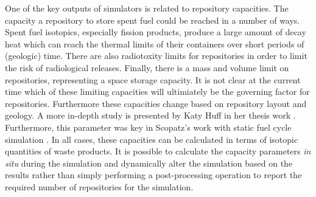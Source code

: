 One of the key outputs of simulators is related to repository capacities. The
capacity a repository to store spent fuel could be reached in a number of
ways. Spent fuel isotopics, especially fission products, produce a large amount
of decay heat which can reach the thermal limits of their containers over short
periods of (geologic) time. There are also radiotoxity limits for repositories
in order to limit the risk of radiological releases. Finally, there is a mass
and volume limit on repositories, representing a space storage capacity. It is
not clear at the current time which of these limiting capacities will
ultimiately be the governing factor for repositories. Furthermore these
capacities change based on repository layout and geology. A more in-depth study
is presented by Katy Huff in her thesis work
\cite{huff_integrated_2013}. Furthermore, this parameter was key in Scopatz's
work with static fuel cycle simulation \cite{scopatz_essential_2011}. In all
cases, these capacities can be calculated in terms of isotopic quantities of
waste products. It is possible to calculate the capacity parameters \textit{in
  situ} during the simulation and dynamically alter the simulation based on the
results rather than simply performing a post-processing operation to report the
required number of repositories for the simulation. 
